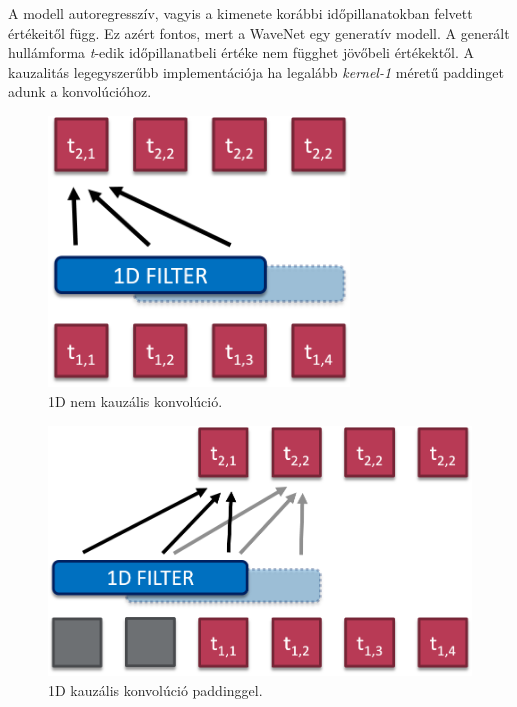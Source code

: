 A modell autoregresszív, vagyis a kimenete korábbi időpillanatokban felvett értékeitől függ. Ez azért fontos, mert a WaveNet egy generatív modell. A generált hullámforma \emph{t}-edik időpillanatbeli értéke nem függhet jövőbeli értékektől. A kauzalitás legegyszerűbb implementációja ha legalább \emph{kernel-1} méretű paddinget adunk a konvolúcióhoz.

\begin{figure}[!ht]
	\centering
	\includegraphics[width=80mm, keepaspectratio]{figures/1d-conv.png}
	\caption{1D nem kauzális konvolúció.}
	\label{fig:1d_noncausal_conv}
\end{figure}

\begin{figure}[!ht]
	\centering
	\includegraphics[width=120mm, keepaspectratio]{figures/1d-causal-conv.png}
	\caption{1D kauzális konvolúció paddinggel.}
	\label{fig:1d_causal_conv}
\end{figure}

\newpage

